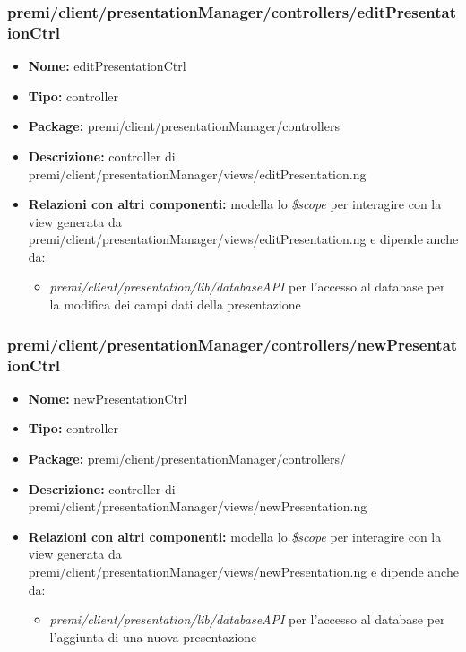 \subsubsection{premi/client/presentationManager/controllers/editPresentationCtrl}
\begin{itemize}
  \item[] \textbf{Nome:} editPresentationCtrl
  \item[] \textbf{Tipo:} controller
  \item[] \textbf{Package:} premi/client/presentationManager/controllers
  \item[] \textbf{Descrizione:} controller di premi/client/presentationManager/views/editPresentation.ng
  \item[] \textbf{Relazioni con altri componenti:} modella lo \textit{\$scope} per interagire con la view generata da premi/client/presentationManager/views/editPresentation.ng e dipende anche da:
 \begin{itemize}
 \item \textit{premi/client/presentation/lib/databaseAPI} per l'accesso al database per la modifica dei campi dati della presentazione
 \end{itemize}
\end{itemize}

\subsubsection{premi/client/presentationManager/controllers/newPresentationCtrl}
\begin{itemize}
  \item[] \textbf{Nome:} newPresentationCtrl
  \item[] \textbf{Tipo:} controller
  \item[] \textbf{Package:} premi/client/presentationManager/controllers/
  \item[] \textbf{Descrizione:} controller di premi/client/presentationManager/views/newPresentation.ng
  \item[] \textbf{Relazioni con altri componenti:} modella lo \textit{\$scope} per interagire con la view generata da premi/client/presentationManager/views/newPresentation.ng e dipende anche da:
 \begin{itemize}
 \item \textit{premi/client/presentation/lib/databaseAPI} per l'accesso al database per l'aggiunta di una nuova presentazione
 \end{itemize}
\end{itemize}

